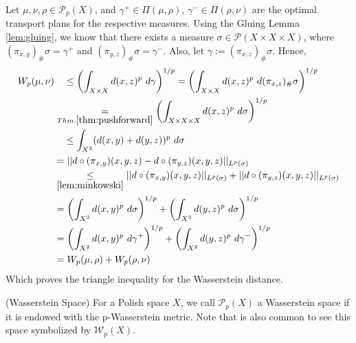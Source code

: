 \begin{prf}
  Let $\mu,\nu,\rho \in \mathcal P_p(X)$, and $\gamma^+ \in \Pi(\mu,\rho)$, $\gamma^- \in \Pi(\rho,\nu)$ are
  the optimal transport plans for the respective measures.
  Using the Gluing Lemma \ref{lem:gluing}, we know that there exists a measure
  $\sigma \in \mathcal P(X \times X \times X)$, where
  $(\pi_{x,y})_\# \sigma = \gamma^+$ and
  $(\pi_{y,z})_\# \sigma = \gamma^-$. Also, let $\gamma := (\pi_{x,z})_\# \sigma$. Hence,
  \begin{align*}
    W_p(\mu,\nu) & \quad \leq
    \left(
      \int_{X \times X} d(x,z)^p \ d\gamma
    \right)^{1/p} =
    \left(
      \int_{X \times X} d(x,z)^p \ d(\pi_{x,z})_\# \sigma
    \right)^{1/p}\\
    & \underset{Thm. \ref{thm:pushforward}}{=}
    \left(
    \int_{X \times X \times X} d(x,z)^p \ d \sigma
    \right)^{1/p}\\
    & \quad \leq
    \int_{X^3} (d(x,y)+d(y,z))^p \ d \sigma \\
    &=
    ||
    d \circ (\pi_{x,y})(x,y,z) -
    d \circ (\pi_{y,z})(x,y,z)
    ||_{L^p(\sigma)} \\
    & \underset{\ref{lem:minkowski}}{\leq}
    ||
    d \circ (\pi_{x,y})(x,y,z)
    ||_{L^p(\sigma)} +
    ||
    d \circ (\pi_{y,z})(x,y,z)
    ||_{L^p(\sigma)} \\
    & =
    \left(
      \int_{X^3} d(x,y)^p \ d\sigma
    \right)^{1/p} +
    \left(
      \int_{X^3} d(y,z)^p \ d\sigma
    \right)^{1/p} \\
    & =
    \left(
      \int_{X^2} d(x,y)^p \ d\gamma^+
    \right)^{1/p} +
    \left(
      \int_{X^2} d(y,z)^p \ d\gamma^-
    \right)^{1/p} \\
    & =
    W_p(\mu,\rho) + W_p(\rho,\nu)
  \end{align*}
  Which proves the triangle inequality for the Wasserstein distance.

\end{prf}

\begin{definition} (Wasserstein Space)
  For a Polish space $X$, we call $\mathcal P_p(X)$ a Wasserstein space if it is endowed with
  the p-Wasserstein metric. Note that is also common to see this space symbolized by $\mathcal W_p(X)$.
\end{definition}

